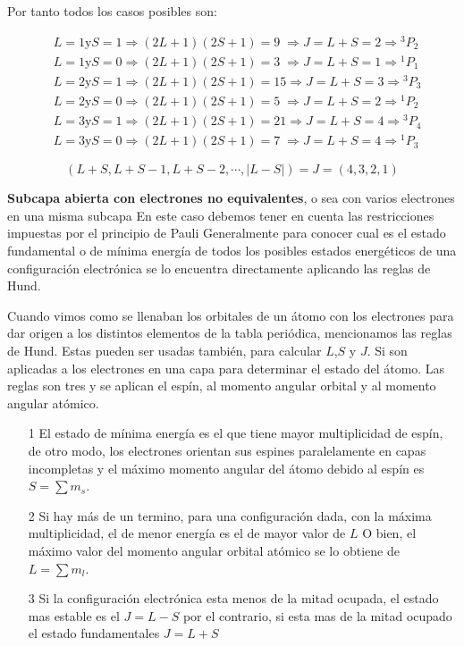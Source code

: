 Por tanto todos los casos posibles son:

\begin{equation*}
\begin{aligned}
	&L=1 \text{y} S=1 \Rightarrow (2L+1)(2S+1)=9\;\Rightarrow J=L+S=2\Rightarrow {^{3}}P_{2}\\
	&L=1 \text{y} S=0 \Rightarrow (2L+1)(2S+1)=3\;\Rightarrow J=L+S=1\Rightarrow {^{1}}P_{1}\\			&L=2 \text{y} S=1 \Rightarrow (2L+1)(2S+1)=15\Rightarrow J=L+S=3\Rightarrow {^{3}}P_{3}\\
	&L=2 \text{y} S=0 \Rightarrow (2L+1)(2S+1)=5\;\Rightarrow J=L+S=2\Rightarrow {^{1}}P_{2}\\
	&L=3 \text{y} S=1 \Rightarrow (2L+1)(2S+1)=21\Rightarrow J=L+S=4\Rightarrow {^{3}}P_{4}\\
	&L=3 \text{y} S=0 \Rightarrow (2L+1)(2S+1)=7\;\Rightarrow J=L+S=4\Rightarrow {^{1}}P_{3}
\end{aligned}
\end{equation*}


\begin{equation*}
	(L+S, L+S-1, L+S-2, \cdots, |L-S|)= J = (4, 3, 2, 1)
\end{equation*}

\textbf{Subcapa abierta con electrones no equivalentes}, o sea con varios electrones en una misma subcapa En este caso debemos tener en cuenta las restricciones impuestas por el principio de Pauli Generalmente para conocer cual es el estado fundamental o de mínima energía de todos los posibles estados energéticos de una configuración electrónica se lo encuentra directamente aplicando las reglas de Hund.

Cuando vimos como se llenaban los orbitales de un átomo con los electrones para dar origen a los distintos elementos de la tabla periódica, mencionamos las reglas de Hund. Estas pueden ser usadas también, para calcular $L$,$S$ y $J$. Si son aplicadas a los electrones en una capa para determinar el estado del átomo. Las reglas son tres y se aplican el espín, al momento angular orbital y al momento angular atómico.

\begin{itemize}
\item[1] El estado de mínima energía es el que tiene mayor multiplicidad de espín, de otro modo, los electrones orientan sus espines paralelamente en capas incompletas y el máximo momento angular del átomo debido al espín es $S=\sum m_{s}$.


\item[2] Si hay más de un termino, para una configuración dada, con la máxima multiplicidad, el de menor energía es el de mayor valor de $L$ O bien, el máximo valor del momento angular orbital atómico se lo obtiene de $L=\sum m_{l}$.


\item[3] Si la configuración electrónica esta menos de la mitad ocupada, el estado mas estable es el $J=L-S$ por el contrario, si esta mas de la mitad ocupado el estado fundamentales $J=L+S$
\end{itemize}

